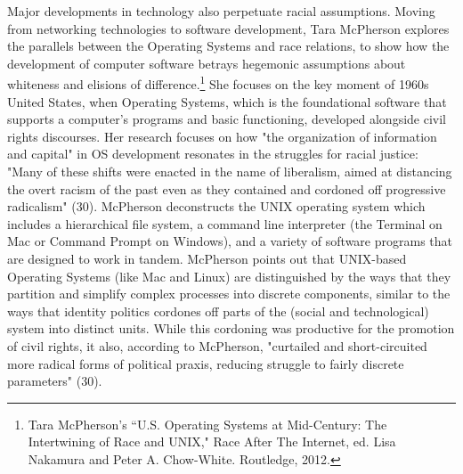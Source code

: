 \documentclass[11pt]{article}
\begin{document}
Major developments in technology also perpetuate racial
assumptions. Moving from networking technologies to software
development, Tara McPherson explores the parallels between the
Operating Systems and race relations, to show how the development of
computer software betrays hegemonic assumptions about whiteness and
elisions of difference.\footnote{Tara McPherson’s “U.S. Operating Systems at Mid-Century: The
Intertwining of Race and UNIX," Race After The Internet, ed. Lisa
Nakamura and Peter A. Chow-White. Routledge, 2012.} She focuses on the key moment of 1960s
United States, when Operating Systems, which is the foundational
software that supports a computer's programs and basic functioning,
developed alongside civil rights discourses. Her research focuses on
how "the organization of information and capital" in OS development
resonates in the struggles for racial justice: "Many of these shifts
were enacted in the name of liberalism, aimed at distancing the overt
racism of the past even as they contained and cordoned off progressive
radicalism" (30). McPherson deconstructs the UNIX operating system
which includes a hierarchical file system, a command line interpreter
(the Terminal on Mac or Command Prompt on Windows), and a variety of
software programs that are designed to work in tandem. McPherson
points out that UNIX-based Operating Systems (like Mac and Linux) are
distinguished by the ways that they partition and simplify complex
processes into discrete components, similar to the ways that identity
politics cordones off parts of the (social and technological) system
into distinct units. While this cordoning was productive for the
promotion of civil rights, it also, according to McPherson, "curtailed
and short-circuited more radical forms of political praxis, reducing
struggle to fairly discrete parameters" (30).
\end{document}
